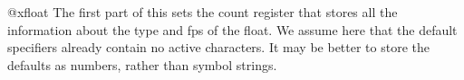   \begin{docCommand}{@xfloat} {}
     The first part of this sets the count register that stores all
     the information about the type and fps of the float.
%
    We assume here that the default specifiers already contain no
    active characters.
%
    It may be better to store the defaults as numbers, rather than
    symbol strings.
%
    \begin{teX}
\def\@xfloat #1[#2]{%
  \@nodocument %
  \def \@captype {#1}%
   \def \@fps {#2}%
   \@onelevel@sanitize \@fps 
   \def \reserved@b {!}%
   \ifx \reserved@b \@fps
     \@fpsadddefault
   \else
     \ifx \@fps \@empty
       \@fpsadddefault
     \fi
   \fi
   \ifhmode
     \@bsphack
     \@floatpenalty -\@Mii
   \else
     \@floatpenalty-\@Miii
   \fi
  \ifinner
     \@parmoderr\@floatpenalty\z@
  \else
    \@next\@currbox\@freelist
      {%
       \@tempcnta \sixt@@n
       \expandafter \@tfor \expandafter \reserved@a
         \expandafter :\expandafter =\@fps 
         \do
          {%
           \if \reserved@a h%
             \ifodd \@tempcnta
             \else
               \advance \@tempcnta \@ne
             \fi
           \fi
           \if \reserved@a t%
             \@setfpsbit \tw@
           \fi
           \if \reserved@a b%
             \@setfpsbit 4%
           \fi
           \if \reserved@a p%
             \@setfpsbit 8%
           \fi
           \if \reserved@a !%
             \ifnum \@tempcnta>15
               \advance\@tempcnta -\sixt@@n\relax
             \fi
           \fi
           }%
       \@tempcntb \csname ftype@\@captype \endcsname
       \multiply \@tempcntb \@xxxii
       \advance \@tempcnta \@tempcntb
       \global \count\@currbox \@tempcnta
       }%
    \@fltovf
  \fi
    \end{teX}


\end{docCommand}
